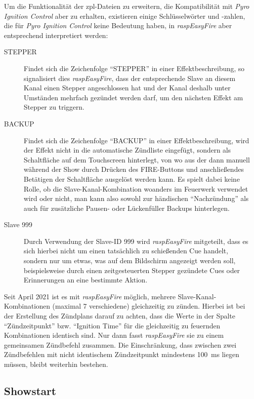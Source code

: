 \documentclass[paper=a4, parskip, numbers=noenddot, toc=listof, headsepline]{scrbook}
\newcommand{\pic}{\emph{Pyro Ignition Control}}
\newcommand{\REF}{\emph{raspEasyFire}}
\begin{document}
				Um die Funktionalität der zpl-Dateien zu erweitern, die Kompatibilität mit \pic{} aber zu erhalten, existieren einige Schlüsselwörter und -zahlen, die für \pic{} keine Bedeutung haben, in \REF{} aber entsprechend interpretiert werden:
				\begin{description}
					\item [STEPPER]
					Findet sich die Zeichenfolge \enquote{STEPPER} in einer Effektbeschreibung, so signalisiert dies \REF{}, dass der entsprechende Slave an diesem Kanal einen Stepper angeschlossen hat und der Kanal deshalb unter Umständen mehrfach gezündet werden darf, um den nächsten Effekt am Stepper zu triggern.
					\item [BACKUP]
					Findet sich die Zeichenfolge \enquote{BACKUP} in einer Effektbeschreibung, wird der Effekt nicht in die automatische Zündliste eingefügt, sondern als Schaltfläche auf dem Touchscreen hinterlegt, von wo aus der dann manuell während der Show durch Drücken des FIRE-Buttons und anschließendes Betätigen der Schaltfläche ausgelöst werden kann. Es spielt dabei keine Rolle, ob die Slave-Kanal-Kombination woanders im Feuerwerk verwendet wird oder nicht, man kann also sowohl zur händischen \enquote{Nachzündung} als auch für zusätzliche Pausen- oder Lückenfüller Backups hinterlegen.
					\item [Slave 999]
					Durch Verwendung der Slave-ID 999 wird \REF{} mitgeteilt, dass es sich hierbei nicht um einen tatsächlich zu schießenden Cue handelt, sondern nur um etwas, was auf dem Bildschirm angezeigt werden soll, beispielsweise durch einen zeitgesteuerten Stepper gezündete Cues oder Erinnerungen an eine bestimmte Aktion.
				\end{description}
			
				Seit April 2021 ist es mit \REF{} möglich, mehrere Slave-Kanal-Kombinationen (maximal 7 verschiedene) gleichzeitig zu zünden. Hierbei ist bei der Erstellung des Zündplans darauf zu achten, dass die Werte in der Spalte \enquote{Zündzeitpunkt} bzw. \enquote{Ignition Time} für die gleichzeitig zu feuernden Kombinationen identisch sind. Nur dann fasst \REF{} sie zu einem gemeinsamen Zündbefehl zusammen. Die Einschränkung, dass zwischen zwei Zündbefehlen mit nicht identischem Zündzeitpunkt mindestens \SI{100}{\milli\second} liegen müssen, bleibt weiterhin bestehen.

			\subsection{Showstart}
\end{document}
